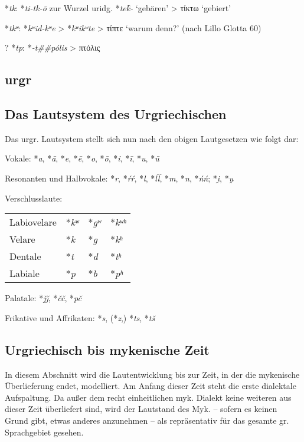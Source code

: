 \documentclass[12pt,a4paper,normalheadings]{scrartcl}
\def\rek#1{*\textit{#1}}
\begin{document}
\rek{tk}: \rek{ti-tk-ō} zur Wurzel uridg. \rek{tek̑-} `gebären' > τίκτω `gebiert'

\rek{tkʷ}: \rek{kʷid-kʷe} > \rek{kʷikʷte} > τίπτε `warum denn?' (nach Lillo Glotta 60)

? \rek{tp}: \rek{-t\#\#pólis} > πτόλις

\subsection*{urgr}

\subsection*{Das Lautsystem des Urgriechischen}
Das urgr. Lautsystem stellt sich nun nach den obigen Lautgesetzen wie folgt dar:

\bigskip
\noindent
Vokale: \rek{a}, \rek{ā}, \rek{e}, \rek{ē}, \rek{o}, \rek{ō},
\rek{i}, \rek{ī}, \rek{u}, \rek{ū}

\noindent
Resonanten und Halbvokale: \rek{r}, \rek{ŕŕ}, \rek{l}, \rek{ĺĺ},
\rek{m}, \rek{n}, \rek{ńń}; \rek{i̯}, \rek{u̯}

\noindent
Verschlusslaute:\\
\begin{tabular}{l l l l}
Labiovelare & \rek{kʷ} & \rek{gʷ} & \rek{kʷʰ}\\
Velare & \rek{k} & \rek{g} & \rek{kʰ}\\
Dentale & \rek{t} & \rek{d} & \rek{tʰ}\\
Labiale & \rek{p} & \rek{b} & \rek{pʰ}\\
\end{tabular}

\noindent
Palatale: \rek{ǰǰ}, \rek{čč}, \rek{pč}

\noindent
Frikative und Affrikaten: \rek{s}, (\rek{z},) \rek{ts}, \rek{tš}

\subsection{Urgriechisch bis mykenische Zeit}

In diesem Abschnitt wird die Lautentwicklung bis zur Zeit,
in der die mykenische Überlieferung endet, modelliert.
Am Anfang dieser Zeit steht die erste dialektale Aufspaltung.
Da außer dem recht einheitlichen myk. Dialekt keine weiteren aus dieser
Zeit überliefert sind,
wird der Lautstand des Myk.
-- sofern es keinen Grund gibt, etwas anderes anzunehmen --
als repräsentativ für das gesamte gr. Sprachgebiet gesehen.
\end{document}
